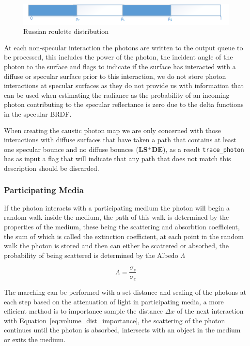 \begin{figure}[h]
\includegraphics{./images/russian_roulette_distribution.png}
\caption{Russian roulette distribution}
\label{fig:rr_dist}
\end{figure}

At each non-specular interaction the photons are written to the output queue to be processed, this includes
the power of the photon, the incident angle of the photon to the surface and flags to indicate if the surface
has interacted with a diffuse or specular surface prior to this interaction, we do not store photon interactions
at specular surfaces as they do not provide us with information that can be used when estimating the radiance as
the probability of an incoming photon contributing to the specular reflectance is zero due to the delta functions
in the specular BRDF.

When creating the caustic photon map we are only concerned with those interactions with diffuse surfaces that have
taken a path that contains at least one specular bounce and no diffuse bounces (\textbf{LS$^+$DE}), as a result \texttt{trace\_photon}
has as input a flag that will indicate that any path that does not match this description should be discarded.

\subsubsection{Participating Media}
If the photon interacts with a participating medium the photon will begin a random walk inside the medium, the path of this walk
is determined by the properties of the medium, these being the scattering and absorbtion coefficient, the sum of which
is called the extinction coefficient, at each point in the random walk the photon is stored and then can either be
scattered or absorbed, the probability of being scattered is determined by the Albedo $\Lambda$


\begin{equation}
\Lambda = \frac{\sigma_s}{\sigma_e}
\end{equation}

The marching can be performed with a set distance and scaling of the photons at each step based on the attenuation of
light in participating media, a more efficient \cite{JensenBook} method is to importance sample the distance $\Delta x$ of the next interaction with 
Equation~\eqref{eq:volume_dist_importance}, the scattering of the photon continues until the photon is absorbed, intersects
with an object in the medium or exits the medium. 

